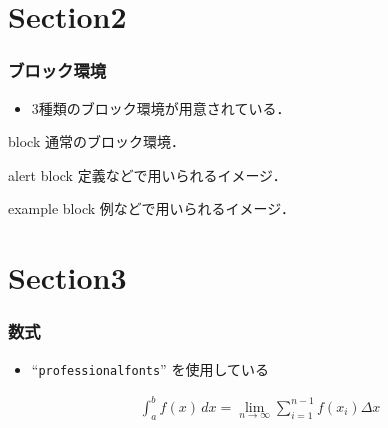 \documentclass[dvipdfmx,11pt]{beamer}
\begin{document}
\section{Section2}
\begin{frame}[t]\frametitle{ブロック環境}
    \begin{itemize}
      \item 3種類のブロック環境が用意されている．
    \end{itemize}
    \begin{block}{block}
      通常のブロック環境．
    \end{block}
    \begin{alertblock}{alert block}
      定義などで用いられるイメージ．
    \end{alertblock}
    \begin{exampleblock}{example block}
      例などで用いられるイメージ．
    \end{exampleblock}
\end{frame}
\section{Section3}
\begin{frame}[t]\frametitle{数式}
    \begin{itemize}
      \item ``\texttt{professionalfonts}'' を使用している
    \end{itemize}
    \begin{align}
        \int^{b}_{a} f(x) \,dx = \lim_{n \to \infty} \sum^{n-1}_{i=1} f(x_{i}) \Delta x
      \end{align}
\end{frame}
\end{document}
